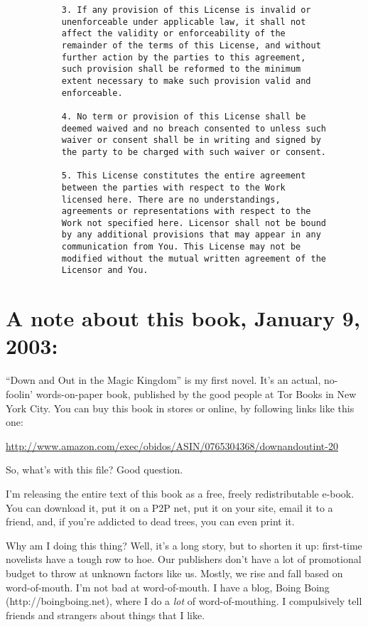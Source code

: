 \begin{verbatim}
           3. If any provision of this License is invalid or
           unenforceable under applicable law, it shall not
           affect the validity or enforceability of the
           remainder of the terms of this License, and without
           further action by the parties to this agreement,
           such provision shall be reformed to the minimum
           extent necessary to make such provision valid and
           enforceable.
        
           4. No term or provision of this License shall be
           deemed waived and no breach consented to unless such
           waiver or consent shall be in writing and signed by
           the party to be charged with such waiver or consent.
        
           5. This License constitutes the entire agreement
           between the parties with respect to the Work
           licensed here. There are no understandings,
           agreements or representations with respect to the
           Work not specified here. Licensor shall not be bound
           by any additional provisions that may appear in any
           communication from You. This License may not be
           modified without the mutual written agreement of the
           Licensor and You.
\end{verbatim}
\section{A note about this book, January 9, 2003:}

“Down and Out in the Magic Kingdom” is my first novel. It's an
actual, no-foolin' words-on-paper book, published by the good
people at Tor Books in New York City. You can buy this book in
stores or online, by following links like this one:

\href{http://www.amazon.com/exec/obidos/ASIN/0765304368/downandoutint-20}{http://www.amazon.com/exec/obidos/ASIN/0765304368/downandoutint-20}

So, what's with this file? Good question.

I'm releasing the entire text of this book as a free, freely
redistributable e-book. You can download it, put it on a P2P net,
put it on your site, email it to a friend, and, if you're addicted
to dead trees, you can even print it.

Why am I doing this thing? Well, it's a long story, but to shorten
it up: first-time novelists have a tough row to hoe. Our publishers
don't have a lot of promotional budget to throw at unknown factors
like us. Mostly, we rise and fall based on word-of-mouth. I'm not
bad at word-of-mouth. I have a blog, Boing Boing
(http://boingboing.net), where I do a \emph{lot} of
word-of-mouthing. I compulsively tell friends and strangers about
things that I like.

